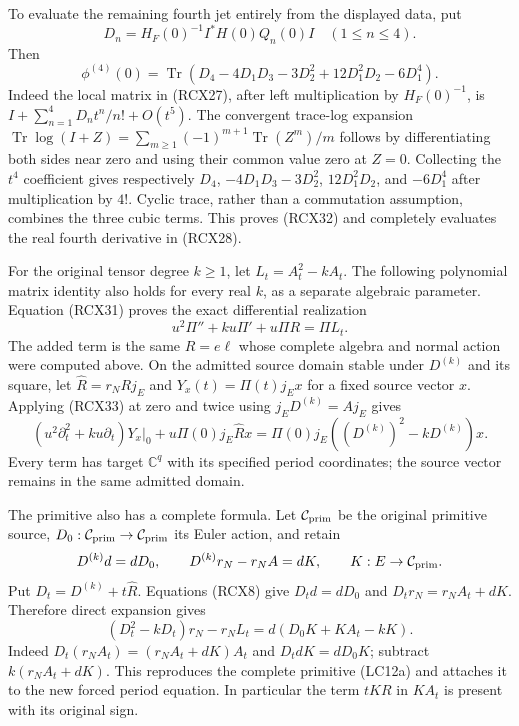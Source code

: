 To evaluate the remaining fourth jet entirely from the displayed
data, put
\[
 D_n=H_F(0)^{-1}I^*H(0)Q_n(0)I\quad(1\le n\le4).
\]
Then
\[
 \phi^{(4)}(0)=
 \operatorname{Tr}\!\left(
 D_4-4D_1D_3-3D_2^2+12D_1^2D_2-6D_1^4\right).
 \tag{RCX32}
\]
Indeed the local matrix in (RCX27), after left multiplication by
\(H_F(0)^{-1}\), is
\(I+\sum_{n=1}^4D_nt^n/n!+O(t^5)\).
The convergent trace-log expansion
\(\operatorname{Tr}\log(I+Z)
=\sum_{m\ge1}(-1)^{m+1}\operatorname{Tr}(Z^m)/m\)
follows by differentiating both sides near zero and using their
common value zero at \(Z=0\).
Collecting the \(t^4\) coefficient gives respectively
\(D_4\), \(-4D_1D_3-3D_2^2\),
\(12D_1^2D_2\), and \(-6D_1^4\) after multiplication by \(4!\).
Cyclic trace, rather than a commutation assumption, combines the
three cubic terms. This proves (RCX32) and completely evaluates
the real fourth derivative in (RCX28).

For the original tensor degree \(k\ge1\), let \(L_t=A_t^2-kA_t\).
The following polynomial matrix identity also holds for every real
\(k\), as a separate algebraic parameter.
Equation (RCX31) proves the exact differential realization
\[
 \boxed{u^2\Pi''+ku\Pi'+u\Pi R=\Pi L_t.}
 \tag{RCX33}
\]
The added term is the same \(R=e\ell\) whose complete algebra
and normal action were computed above. On the admitted source
domain stable under \(D^{(k)}\) and its square, let
\(\widehat R=r_NRj_E\) and \(Y_x(t)=\Pi(t)j_Ex\) for a fixed
source vector \(x\). Applying (RCX33) at zero and twice using
\(j_ED^{(k)}=Aj_E\) gives
\[
 (u^2\partial_t^2+ku\partial_t)Y_x|_0
       +u\Pi(0)j_E\widehat R x
 =\Pi(0)j_E((D^{(k)})^2-kD^{(k)})x .
 \tag{RCX34}
\]
Every term has target \(\mathbb C^q\) with its specified period
coordinates; the source vector remains in the same admitted domain.

The primitive also has a complete formula. Let
\(\mathcal C_{\rm prim}\) be the original primitive source,
\(D_0:\mathcal C_{\rm prim}\to\mathcal C_{\rm prim}\) its Euler
action, and retain
\[
 D^{(k)}d=dD_0,\qquad
 D^{(k)}r_N-r_NA=dK,\qquad K:E\to\mathcal C_{\rm prim}.
\]
Put \(D_t=D^{(k)}+t\widehat R\). Equations (RCX8) give
\(D_td=dD_0\) and \(D_tr_N=r_NA_t+dK\).
Therefore direct expansion gives
\[
 \boxed{(D_t^2-kD_t)r_N-r_NL_t
       =d(D_0K+KA_t-kK).}
 \tag{RCX35}
\]
Indeed \(D_t(r_NA_t)=(r_NA_t+dK)A_t\) and
\(D_tdK=dD_0K\); subtract \(k(r_NA_t+dK)\).
This reproduces the complete primitive (LC12a) and attaches it
to the new forced period equation. In particular the term
\(tKR\) in \(KA_t\) is present with its original sign.

